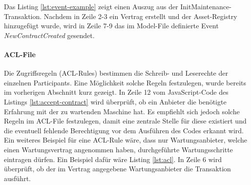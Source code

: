 Das Listing \ref{lst:event-example} zeigt einen Auszug aus der InitMaintenance-Transaktion. Nachdem in Zeile 2-3 ein Vertrag erstellt und der Asset-Registry hinzugefügt wurde, wird in Zeile 7-9 das im Model-File definierte Event \textit{NewContractCreated} gesendet.


\paragraph{ACL-File}
Die Zugriffsregeln (ACL-Rules) bestimmen die Schreib- und Leserechte der einzelnen Participants. Eine Möglichkeit solche Regeln festzulegen, wurde bereits im vorherigen Abschnitt kurz gezeigt. In Zeile 12 vom JavaScript-Code des Listings \ref{lst:accept-contract} wird überprüft, ob ein Anbieter die benötigte Erfahrung mit der zu wartenden Maschine hat. Es empfiehlt sich jedoch solche Regeln im ACL-File festzulegen, damit eine zentrale Stelle für diese existiert und die eventuell fehlende Berechtigung vor dem Ausführen des Codes erkannt wird. Ein weiteres Beispiel für eine ACL-Rule wäre, dass nur Wartungsanbieter, welche einen Wartungsvertrag angenommen haben, durchgeführte Wartungsschritte eintragen dürfen. Ein Beispiel dafür wäre Listing \ref{lst:acl}. In Zeile 6 wird überprüft, ob der im Vertrag angegebene Wartungsanbieter die Transaktion ausführt.



